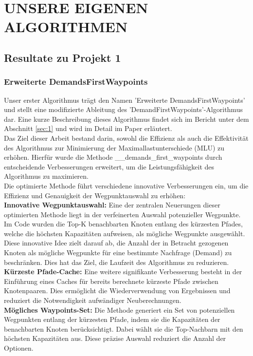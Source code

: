 \documentclass[sigconf, nonacm, review]{acmart}
\begin{document}
\section{UNSERE EIGENEN ALGORITHMEN}
\subsection{Resultate zu Projekt 1}

\subsubsection{Erweiterte DemandsFirstWaypoints }
Unser erster Algorithmus trägt den Namen 'Erweiterte DemandsFirstWaypoints' und stellt eine modifizierte Ableitung des 'DemandFirstWaypoints'-Algorithmus dar. Eine kurze Beschreibung dieses Algorithmus findet sich im Bericht unter dem Abschnitt \ref{sec:1} und wird im Detail im Paper \cite{foerster2021} erläutert.\\
Das Ziel dieser Arbeit bestand darin, sowohl die Effizienz als auch die Effektivität des Algorithmus zur Minimierung der Maximallastunterschiede (MLU) zu erhöhen. Hierfür wurde die Methode \_\_demands\_first\_waypoints durch entscheidende Verbesserungen erweitert, um die Leistungsfähigkeit des Algorithmus zu maximieren.\\
Die optimierte Methode führt verschiedene innovative Verbesserungen ein, um die Effizienz und Genauigkeit der Wegpunktauswahl zu erhöhen:\\
\textbf{Innovative Wegpunktauswahl:}
Eine der zentralen Neuerungen dieser optimierten Methode liegt in der verfeinerten Auswahl potenzieller Wegpunkte. Im Code wurden die Top-K benachbarten Knoten entlang des kürzesten Pfades, welche die höchsten Kapazitäten aufweisen, als mögliche Wegpunkte ausgewählt. Diese innovative Idee zielt darauf ab, die Anzahl der in Betracht gezogenen Knoten als mögliche Wegpunkte für eine bestimmte Nachfrage (Demand) zu beschränken. Dies hat das Ziel, die Laufzeit des Algorithmus zu reduzieren.\\
\textbf{Kürzeste Pfade-Cache:} Eine weitere signifikante Verbesserung besteht in der Einführung eines Caches für bereits berechnete kürzeste Pfade zwischen Knotenpaaren. Dies ermöglicht die Wiederverwendung von Ergebnissen und reduziert die Notwendigkeit aufwändiger Neuberechnungen.\\
\textbf{Mögliches Waypoints-Set:}  Die Methode generiert ein Set von potenziellen Wegpunkten entlang der kürzesten Pfade, indem sie die Kapazitäten der benachbarten Knoten berücksichtigt. Dabei wählt sie die Top-Nachbarn mit den höchsten Kapazitäten aus. Diese präzise Auswahl reduziert die Anzahl der Optionen.\\
\end{document}
